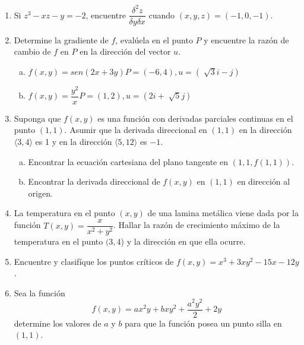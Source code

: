 \documentclass[12pt]{article}
\newenvironment{preguntas}
{\begin{enumerate}\itemsep12pt
	}
	{
	\end{enumerate}
}
\begin{document}
\begin{preguntas}
\item Si $z^3 - xz - y = -2$, encuentre $\dfrac{\delta^2z}{\delta y \delta x}$ cuando $(x,y,z) = (-1, 0, -1)$.
\item Determine la gradiente de $f$, evalúela en el punto $P$ y encuentre la razón de cambio de $f$ en $P$ en la dirección del vector $u$.
\begin{enumerate}[a)]
\item $f(x,y) = sen(2x+3y)$\tab$P=(-6,4), u=\left(\sqrt[]{3}i - j\right)$
\item $f(x,y) = \dfrac{y^2}{x}$\tab$P=(1,2), u=\left(2i + \sqrt[]{5}j\right)$
\end{enumerate}
\item Suponga que $f(x,y)$ es una función con derivadas parciales continuas en el punto $(1,1)$. Asumir que la derivada direccional en $(1,1)$ en la dirección $\langle3,4\rangle$ 			es 1 y en la dirección $\langle5,12\rangle$ es $-1$.
\begin{enumerate}[a)]
\item Encontrar la ecuación cartesiana del plano tangente en $(1,1,f(1,1))$.
\item Encontrar la derivada direccional de $f(x,y)$ en $(1,1)$ en dirección al origen.	
\end{enumerate}
\item La temperatura en el punto $(x,y)$ de una lamina metálica viene dada por la función $T(x,y) = \dfrac{x}{x^2+y^2}$. Hallar la razón de crecimiento máximo de la temperatura en el punto $(3,4$) y la dirección en que ella ocurre.
\item Encuentre y clasifíque los puntos críticos de $f(x,y)=x^3+3xy^2-15x-12y$.
\item Sea la función
	$$f(x,y)=ax^2y+bxy^2+\dfrac{a^2y^2}{2}+2y$$
	determine los valores de $a$ y $b$ para que la función posea un punto silla en $(1,1)$.
\end{preguntas}
\end{document}
